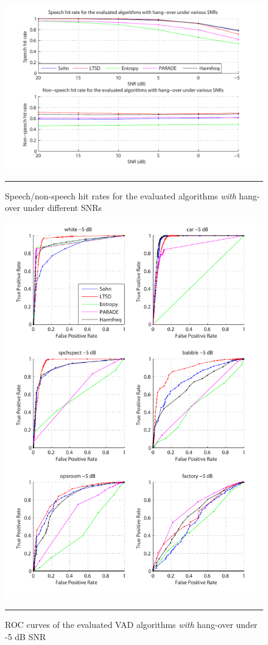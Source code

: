 \begin{figure}[htbp]
	\centering
		\includegraphics[width=0.9\columnwidth]{Figures/Chapter4/snrh.pdf}
		\rule{37em}{0.5pt}
	\caption[Speech/non-speech hit rates for the evaluated algorithms \emph{with} hang-over under different SNRs]{Speech/non-speech hit rates for the evaluated algorithms \emph{with} hang-over under different SNRs}
	\label{fig:snrh}
\end{figure}

\begin{figure}[htbp]
	\centering
		\includegraphics[width=1.0\columnwidth]{Figures/Chapter4/-5dBh.pdf}
		\rule{37em}{0.5pt}
	\caption[ROC curves of the evaluated algorithms \emph{with} hang-over under -5 dB SNR]{ROC curves of the evaluated VAD algorithms \emph{with} hang-over under -5 dB SNR}
	\label{fig:-5dBh}
\end{figure}

